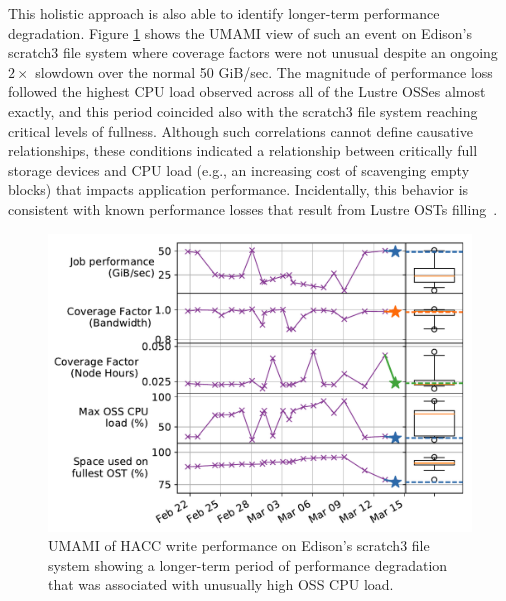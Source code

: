 This holistic approach is also able to identify longer-term performance degradation.
Figure \ref{fig:umami-scratch3-hacc-write-long-term} shows the UMAMI view of such an event on Edison's scratch3 file system where coverage factors were not unusual despite an ongoing $2\times$ slowdown over the normal 50 GiB/sec.
The magnitude of performance loss followed the highest CPU load observed across all of the Lustre OSSes almost exactly, and this period coincided also with the scratch3 file system reaching critical levels of fullness.
Although such correlations cannot define causative relationships, these conditions indicated a relationship between critically full storage devices and CPU load (e.g., an increasing cost of scavenging empty blocks) that impacts application performance.
Incidentally, this behavior is consistent with known performance losses that result from Lustre OSTs filling~\cite{oral2014best}.
 
\begin{figure}[t]
    \centering
    \includegraphics[width=1.0\columnwidth]{figs/umami-scratch3-hacc-write-long-term.pdf}
    \caption{UMAMI of HACC write performance on Edison's scratch3 file system showing a longer-term period of performance degradation that was associated with unusually high OSS CPU load.
    }
    \label{fig:umami-scratch3-hacc-write-long-term}
\vspace{-.2in}
\end{figure}

